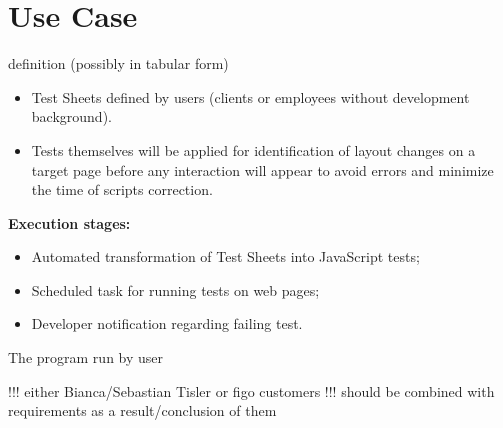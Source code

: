 \chapter{Use Case}
\label{sec:Use Case}
 definition (possibly in tabular form)


\begin{itemize}
\item Test Sheets defined by users (clients or employees without development background).
\item Tests themselves will be applied for identification of layout changes on a target page before any interaction will appear to avoid errors and minimize the time of scripts correction.
\end{itemize}
 
\textbf{Execution stages:}
\begin{itemize}
\item Automated transformation of Test Sheets into JavaScript tests;
\item Scheduled task for running tests on web pages;
\item Developer notification regarding failing test.
\end{itemize}

The program run by user 

!!! either Bianca/Sebastian Tisler or figo customers
!!! should be combined with requirements as a result/conclusion of them
